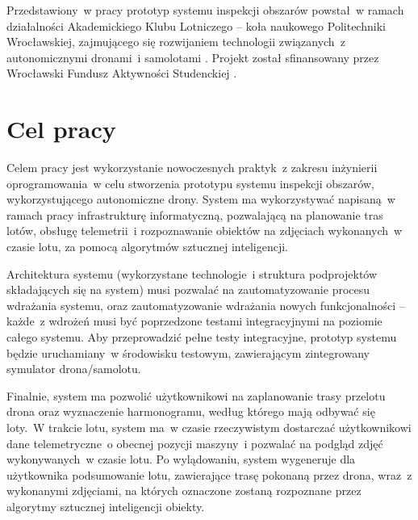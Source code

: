 Przedstawiony~w pracy prototyp systemu inspekcji obszarów powstał~w ramach działalności
Akademickiego Klubu Lotniczego -- koła naukowego Politechniki Wrocławskiej, zajmującego
się rozwijaniem technologii związanych~z autonomicznymi dronami~i samolotami
\cite{akl_home_page}. Projekt został sfinansowany przez Wrocławski Fundusz
Aktywności Studenckiej \cite{fast_webpage}.

  


\newpage
\section{Cel pracy} \label{intro_objective}

Celem pracy jest wykorzystanie nowoczesnych praktyk~z zakresu inżynierii 
oprogramowania~w celu stworzenia prototypu systemu inspekcji obszarów,
wykorzystującego autonomiczne drony. System ma wykorzystywać napisaną~w ramach pracy
infrastrukturę informatyczną, pozwalającą na planowanie tras lotów, obsługę telemetrii~i
rozpoznawanie obiektów na zdjęciach wykonanych~w czasie lotu, za pomocą algorytmów
sztucznej inteligencji. 

Architektura systemu (wykorzystane technologie~i struktura podprojektów składających
się na system) musi pozwalać na zautomatyzowanie procesu wdrażania
systemu, oraz zautomatyzowanie wdrażania nowych funkcjonalności -- każde~z wdrożeń musi
być poprzedzone testami integracyjnymi na poziomie całego systemu.
Aby przeprowadzić pełne testy integracyjne, prototyp systemu będzie uruchamiany~w
środowisku testowym, zawierającym zintegrowany symulator drona/samolotu.

Finalnie, system ma pozwolić użytkownikowi na zaplanowanie trasy przelotu drona
oraz wyznaczenie harmonogramu, według którego mają odbywać się loty.~W trakcie 
lotu, system ma~w czasie rzeczywistym dostarczać użytkownikowi dane telemetryczne~o
obecnej pozycji maszyny~i pozwalać na podgląd zdjęć wykonywanych~w czasie lotu.
Po wylądowaniu, system wygeneruje dla użytkownika podsumowanie lotu, zawierające
trasę pokonaną przez drona, wraz~z wykonanymi zdjęciami, na których oznaczone zostaną
rozpoznane przez algorytmy sztucznej inteligencji obiekty.

